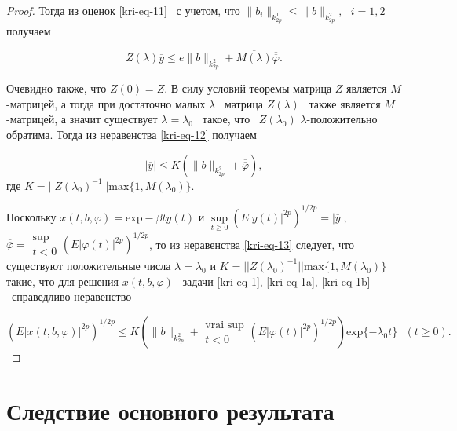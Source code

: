 \begin{proof}
Тогда из оценок \eqref{kri-eq-11} \ с учетом, что  $\|b_i\|_{k_{2p}^1}\le \|b\|_{k_{2p}^2},\text{  }i=1,2$ получаем

\begin{equation}\label{kri-eq-12}
	Z(\lambda
	)\overline y\le e\|b\|_{k_{2p}^2}+\overline{M(\lambda )}\overline{\overline{\varphi
	}}.
\end{equation}

Очевидно также, что  $Z(0)=Z$. В силу условий теоремы матрица  $Z$ является  $M$-\linebreak матрицей, а тогда при достаточно
малых  $\lambda $ \ матрица  $Z(\lambda )$ \ также является  $M${}-матрицей, а значит существует  $\lambda =\lambda _0$
\ такое, что \  $Z(\lambda _0)$ $\lambda$-положительно обратима. Тогда из неравенства \eqref{kri-eq-12} получаем

\begin{equation}\label{kri-eq-13}
	|\overline y|\le K(\|b\|_{k_{2p}^2}+\overline{\overline{\varphi
	}}),
\end{equation}
где  $K=||Z(\lambda _0)^{-1}||\text{max}\{1,M(\lambda _0)\}.$

Поскольку  $x(t,b,\varphi )=\text{exp}-\beta ty(t)$  и   $\underset{t\ge
0}\sup\left(E|y(t)|^{2p}\right)^{1/2p}=|\overline y|$,  $\overline{\overline{\varphi
}}=\begin{matrix}\sup\\t<0\end{matrix}\left(E|\varphi (t)|^{2p}\right)^{1/2p}$, то из неравенства \eqref{kri-eq-13} следует,
что существуют положительные числа  $\lambda =\lambda _0$  и \linebreak  $K=||Z(\lambda _0)^{-1}||\text{max}\{1,M(\lambda _0)\}$
такие, что для решения  $x(t,b,\varphi )$ \ задачи \eqref{kri-eq-1}, \eqref{kri-eq-1a}, \eqref{kri-eq-1b} \ справедливо неравенство

\begin{equation*}
(E|x(t,b,\varphi )|^{2p})^{1/2p}\le
K\left(\|b\|_{k_{2p}^2}+\begin{matrix}\text{vrai sup}\\t<0\end{matrix}(E|\varphi
(t)|^{2p})^{1/2p}\right)\text{exp}\{-\lambda _0 t\}\text{  }(t\ge 0).
\end{equation*}
\end{proof}

\section{Следствие основного результата}

